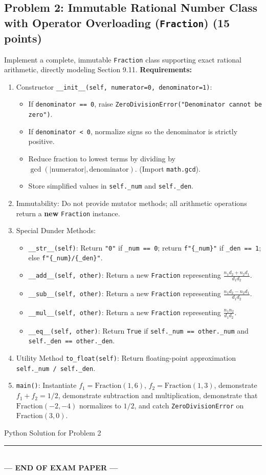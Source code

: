 \documentclass[11pt,a4paper]{article}
\begin{document}
\subsection*{Problem 2: Immutable Rational Number Class with Operator Overloading (\texttt{Fraction}) (15 points)}
Implement a complete, immutable \texttt{Fraction} class supporting exact rational arithmetic, directly modeling Section 9.11.
\textbf{Requirements:}
\begin{enumerate}[label=\arabic*.,leftmargin=2em,itemsep=1.2pt]
\item Constructor \texttt{\_\_init\_\_(self, numerator=0, denominator=1)}:
  \begin{itemize}
  \item If \texttt{denominator == 0}, raise \texttt{ZeroDivisionError("Denominator cannot be zero")}.
  \item If \texttt{denominator < 0}, normalize signs so the denominator is strictly positive.
  \item Reduce fraction to lowest terms by dividing by $\gcd(|\text{numerator}|, \text{denominator})$. (Import \texttt{math.gcd}).
  \item Store simplified values in \texttt{self.\_num} and \texttt{self.\_den}.
  \end{itemize}
\item Immutability: Do not provide mutator methods; all arithmetic operations return a \textbf{new} \texttt{Fraction} instance.
\item Special Dunder Methods:
  \begin{itemize}
  \item \texttt{\_\_str\_\_(self)}: Return \texttt{"0"} if \texttt{\_num == 0}; return \texttt{f"\{\_num\}"} if \texttt{\_den == 1}; else \texttt{f"\{\_num\}/\{\_den\}"}.
  \item \texttt{\_\_add\_\_(self, other)}: Return a new \texttt{Fraction} representing $\frac{n_1 d_2 + n_2 d_1}{d_1 d_2}$.
  \item \texttt{\_\_sub\_\_(self, other)}: Return a new \texttt{Fraction} representing $\frac{n_1 d_2 - n_2 d_1}{d_1 d_2}$.
  \item \texttt{\_\_mul\_\_(self, other)}: Return a new \texttt{Fraction} representing $\frac{n_1 n_2}{d_1 d_2}$.
  \item \texttt{\_\_eq\_\_(self, other)}: Return \texttt{True} if \texttt{self.\_num == other.\_num} and \texttt{self.\_den == other.\_den}.
  \end{itemize}
\item Utility Method \texttt{to\_float(self)}: Return floating-point approximation \texttt{self.\_num / self.\_den}.
\item \texttt{main()}: Instantiate $f_1 = \text{Fraction}(1, 6)$, $f_2 = \text{Fraction}(1, 3)$, demonstrate $f_1 + f_2 = 1/2$, demonstrate subtraction and multiplication, demonstrate that $\text{Fraction}(-2, -4)$ normalizes to $1/2$, and catch \texttt{ZeroDivisionError} on $\text{Fraction}(3, 0)$.
\end{enumerate}
\begin{answerbox}[height=8.8cm]{Python Solution for Problem 2}\end{answerbox}
\vfill
\begin{center}\rule{0.5\textwidth}{0.4pt}\\[1mm]
\textbf{\color{primaryblue}--- END OF EXAM PAPER ---}
\end{center}
\end{document}
